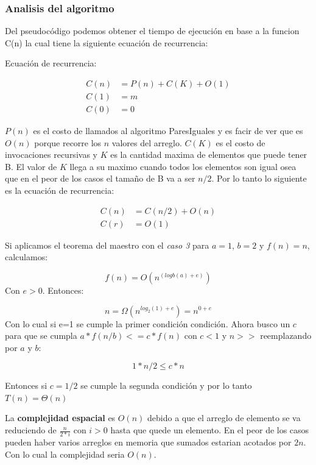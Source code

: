 \documentclass{article}
\begin{document}
\subsubsection{Analisis del algoritmo}

Del pseudocódigo podemos obtener el tiempo de ejecución en base a la funcion C(n) la cual tiene la siguiente ecuación de recurrencia:

Ecuación de recurrencia:

\begin{equation} \label{eq1}
    \begin{split}
        C(n) & = P(n) + C(K) + O(1) \\
        C(1) & = m \\
        C(0) & = 0
    \end{split} 
\end{equation}


\(P(n)\) es el costo de llamados al algoritmo ParesIguales y es facir de ver que es \(O(n)\) porque recorre los \(n\) valores del arreglo. 
\(C(K)\) es el costo de invocaciones recursivas y \(K\) es la cantidad maxima de elementos que puede tener B. 
El valor de \(K\) llega a su maximo cuando todos los elementos son igual osea que en el peor de los casos el tamaño de B va a ser \(n/2\). Por lo tanto lo siguiente es la ecuación de recurrencia:

\begin{equation} \label{eq1}
    \begin{split}
        C(n) &= C(n/2) + O(n) \\
        C(r) &= O(1)
    \end{split} 
\end{equation}


Si aplicamos el teorema del maestro con el \textit{caso 3} para \(a=1\), \(b=2\) y \(f(n)=n\), calculamos:

\[
    f(n) = O(n^{(logb(a) + e)}) 
\]
Con \(e>0\). Entonces:

\[
    n =  \Omega(n^{log_2(1) + e} ) = n^{0 + e}
\]
Con lo cual si e=1 se cumple la primer condición condición. Ahora busco un \(c\) para que se cumpla \(a*f(n/b) <= c*f(n)\) con \(c < 1\) y \(n>>\) reemplazando por \(a\) y \(b\):

\[
    1*n/2 \leq c * n    
\]

Entonces si \(c=1/2\) se cumple la segunda condición y por lo tanto \(T(n) = \Theta(n)\)

La \textbf{complejidad espacial} es \(O(n)\) debido a que el arreglo de elemento se va reduciendo de \( \frac{n}{2*i} \) con \(i > 0\) hasta que quede un elemento. 
En el peor de los casos pueden haber varios arreglos en memoria que sumados estarian acotados por \(2n\). 
Con lo cual la complejidad seria \(O(n)\).
\end{document}

